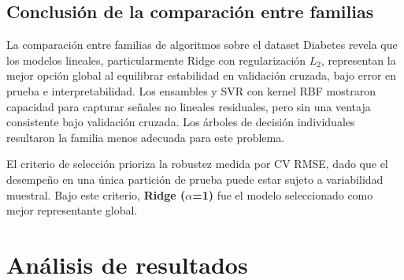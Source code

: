 \documentclass[12pt,letterpaper]{article}
\begin{document}
\begin{table}[H]
\centering
\caption{Ventajas y limitaciones de cada familia en el contexto del dataset Diabetes.}
\end{table}

\subsection{Conclusión de la comparación entre familias}

La comparación entre familias de algoritmos sobre el dataset Diabetes revela que los modelos lineales, particularmente Ridge con regularización $L_2$, representan la mejor opción global al equilibrar estabilidad en validación cruzada, bajo error en prueba e interpretabilidad. Los ensambles y SVR con kernel RBF mostraron capacidad para capturar señales no lineales residuales, pero sin una ventaja consistente bajo validación cruzada. Los árboles de decisión individuales resultaron la familia menos adecuada para este problema.

El criterio de selección prioriza la robustez medida por CV RMSE, dado que el desempeño en una única partición de prueba puede estar sujeto a variabilidad muestral. Bajo este criterio, \textbf{Ridge ($\alpha$=1)} fue el modelo seleccionado como mejor representante global.

\section{Análisis de resultados}
\end{document}

